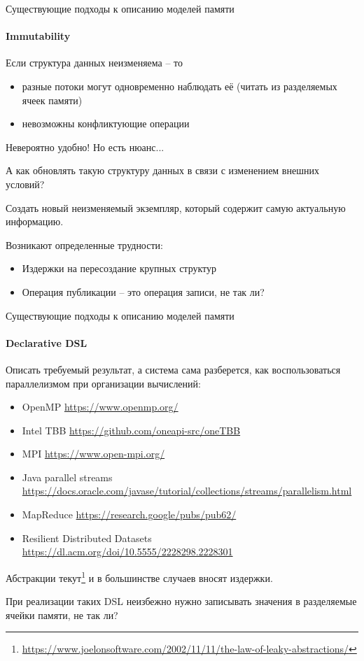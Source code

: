 \begin{frame}[fragile, t]{Существующие подходы к описанию моделей памяти}
\framesubtitle{Immutability}

Если структура данных неизменяема -- то 

\begin{itemize}
	\pause
	\item разные потоки могут одновременно наблюдать её (читать из разделяемых ячеек памяти)

	\pause
	\item невозможны конфликтующие операции	
\end{itemize}

\pause
Невероятно удобно!
\pause
Но есть нюанс...

\pause
А как обновлять такую структуру данных в связи с изменением внешних условий?

\pause
Создать новый неизменяемый экземпляр, который содержит самую актуальную информацию.

\pause
Возникают определенные трудности:
\begin{itemize}
	\pause
	\item Издержки на пересоздание крупных структур

	\pause
	\item Операция публикации -- это операция записи, не так ли? 
\end{itemize}
\end{frame}

\begin{frame}[fragile, t]{Существующие подходы к описанию моделей памяти}
\framesubtitle{Declarative DSL}

Описать требуемый результат, а система сама разберется, как воспользоваться параллелизмом при организации вычислений:

\pause
\begin{itemize}
	\item OpenMP {\tiny\url{https://www.openmp.org/}}
	\item Intel TBB {\tiny\url{https://github.com/oneapi-src/oneTBB}}
	\item MPI {\tiny\url{https://www.open-mpi.org/}}
	\item Java parallel streams {\tiny\url{https://docs.oracle.com/javase/tutorial/collections/streams/parallelism.html}}
	\item MapReduce {\tiny\url{https://research.google/pubs/pub62/}}
	\item Resilient Distributed Datasets {\tiny\url{https://dl.acm.org/doi/10.5555/2228298.2228301}}
\end{itemize}

\pause
Абстракции текут\footnote<3->{\tiny\url{https://www.joelonsoftware.com/2002/11/11/the-law-of-leaky-abstractions/}} и в большинстве случаев вносят издержки.

\pause
При реализации таких DSL неизбежно нужно записывать значения в разделяемые ячейки памяти, не так ли?
\end{frame}



